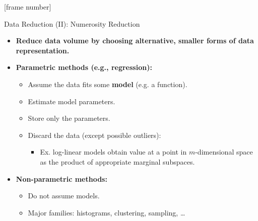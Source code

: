 \documentclass[aspectratio=169,t]{beamer}
\begin{document}
  {
    [frame number]
    \begin{frame}{Data Reduction (II): Numerosity Reduction}
    \begin{itemize}
      \item \textbf{Reduce data volume by choosing alternative, {\color{airforceblue}smaller} forms of data representation.}
      \item \textbf{{\color{airforceblue}Parametric} methods (e.g., regression):}
      \begin{itemize}
        \item Assume the data fits some \textbf{{\color{airforceblue}model}} (e.g. a function).
        \item Estimate model parameters.
        \item Store only the parameters.
        \item Discard the data (except possible outliers):
        \begin{itemize}
          \item Ex. log-linear models obtain value at a point in $m$-dimensional space as the product of appropriate marginal subspaces.
        \end{itemize}
      \end{itemize}
      \item \textbf{{\color{airforceblue}Non-parametric} methods:}
      \begin{itemize}
        \item Do not assume models.
        \item Major families: histograms, clustering, sampling, \ldots
      \end{itemize}
    \end{itemize}
    \end{frame}
  }
\end{document}
